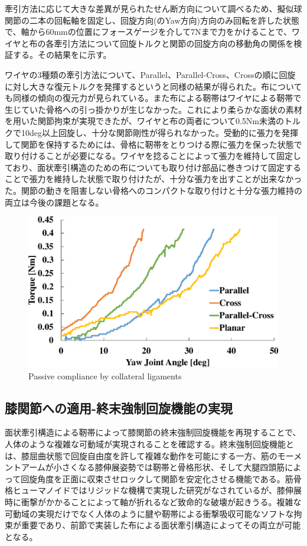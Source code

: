 \documentclass{jarticle}
\begin{document}
牽引方法に応じて大きな差異が見られたせん断方向について調べるため、擬似球関節の二本の回転軸を固定し、回旋方向(のYaw方向)方向のみ回転を許した状態で、軸から60mmの位置にフォースゲージを介して7Nまで力をかけることで、ワイヤと布の各牽引方法について回旋トルクと関節の回旋方向の移動角の関係を検証する。その結果をに示す。

ワイヤの3種類の牽引方法について、Parallel、Parallel-Cross、Crossの順に回旋に対し大きな復元トルクを発揮するというと同様の結果が得られた。布についても同様の傾向の復元力が見られている。また布による靭帯はワイヤによる靭帯で生じていた骨格への引っ掛かりが生じなかった。これにより柔らかな面状の素材を用いた関節拘束が実現できたが、ワイヤと布の両者について0.5Nm未満のトルクで10deg以上回旋し、十分な関節剛性が得られなかった。受動的に張力を発揮して関節を保持するためには、骨格に靭帯をとりつける際に張力を保った状態で取り付けることが必要になる。ワイヤを捻ることによって張力を維持して固定しており、面状牽引構造のための布についても取り付け部品に巻きつけて固定することで張力を維持した状態で取り付けたが、十分な張力を出すことが出来なかった。関節の動きを阻害しない骨格へのコンパクトな取り付けと十分な張力維持の両立は今後の課題となる。

\begin{figure}[tb]
 \centering
 \includegraphics[width=0.9\columnwidth]{figs/passive-compliance.pdf}
  \vspace*{-4mm}
  \caption{Passive compliance by collateral ligaments}
  \label{fig:passive-compliance}
\end{figure}

\subsection{膝関節への適用-終末強制回旋機能の実現}
面状牽引構造による靭帯によって膝関節の終末強制回旋機能を再現することで、人体のような複雑な可動域が実現されることを確認する。終末強制回旋機能とは、膝屈曲状態で回旋自由度を許して複雑な動作を可能にする一方、筋のモーメントアームが小さくなる膝伸展姿勢では靭帯と骨格形状、そして大腿四頭筋によって回旋角度を正面に収束させロックして関節を安定化させる機能である。筋骨格ヒューマノイドではリジッドな機構で実現した研究\cite{IROS2013:asano:knee}がなされているが、膝伸展時に衝撃がかかることによって軸が折れるなど致命的な破壊が起きうる。複雑な可動域の実現だけでなく人体のように腱や靭帯による衝撃吸収可能なソフトな拘束が重要であり、前節で実装した布による面状牽引構造によってその両立が可能となる。
\end{document}
